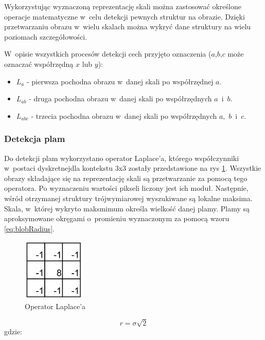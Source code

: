 Wykorzystując wyznaczoną reprezentację skali można zastosować określone operacje matematyczne w~celu detekcji pewnych struktur na obrazie. Dzięki przetwarzaniu obrazu w~wielu skalach można wykryć dane struktury na wielu poziomach szczegółowości.

W~opisie wszystkich procesów detekcji cech przyjęto oznaczenia ($ a$,$ b$,$ c $ może oznaczać współrzędną $ x $ lub $ y $):

\begin{itemize}
\item $ L_a $ - pierwsza pochodna obrazu w~danej skali po współrzędnej $ a $.
\item $ L_{ab} $ - druga pochodna obrazu w~danej skali po współrzędnych $ a $~i~$b$.
\item $ L_{abc} $ - trzecia pochodna obrazu w~danej skali po współrzędnych $ a $,~$b$~i~$c$.
\end{itemize}

\subsubsection{Detekcja plam}
\label{subsubsec:detekcjaPlam}

Do detekcji plam wykorzystano operator Laplace'a, którego współczynniki w~postaci dyskretnejdla kontekstu 3x3 zostały przedstawione na rys \ref{fig:laplacian_kernel}. Wszystkie obrazy składające się na reprezentację skali są przetwarzanie za pomocą tego operatora. Po wyznaczeniu wartości pikseli liczony jest ich moduł. Następnie, wśród otrzymanej struktury trójwymiarowej wyszukiwane są lokalne maksima. Skala, w~której wykryto maksmimum określa wielkość danej plamy. Plamy są aproksymowane okręgami o~promieniu wyznaczonym za pomocą wzoru \eqref{eq:blobRadius}.

\begin{figure}
\begin{center}
\includegraphics[width=3cm]{laplacian.pdf}
\end{center}
\caption{Operator Laplace'a}
\label{fig:laplacian_kernel}
\end{figure}

\begin{equation}
\label{eq:blobRadius}
r = \sigma  \sqrt{2}
\end{equation}
gdzie:

